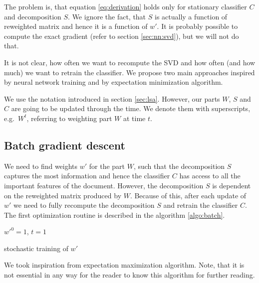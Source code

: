     The problem is, that equation \ref{eq:derivation} holds only for stationary classifier $C$ and decomposition $S$. 
    We ignore the fact, that $S$ is actually a function of reweighted matrix and hence it is a function of $w'$.
    It is probably possible to compute the exact gradient (refer to section \ref{sec:nn:svd}), but we will not do that.
    
    It is not clear, how often we want to recompute the SVD and how often (and how much) we want to retrain the classifier.
    We propose two main approaches inspired by neural network training and by 
    expectation minimization algorithm.
    
    We use the notation introduced in section \ref{sec:lsa}.
    However, our parts $W$, $S$ and $C$ are going to be updated through the time. We denote them with superscripts, e.g.~$W^t$, referring to weighting part $W$ at time $t$.
    
    \subsection{Batch gradient descent}
    
    We need to find weights $w'$ for the part $W$, 
    such that the decomposition $S$ captures the most information and hence the classifier $C$ has access to all the important features of the document.
    However, the decomposition $S$ is dependent on the reweighted matrix produced by $W$. 
    Because of this, after each update of $w'$ we need to fully recompute the decomposition $S$ and retrain the classifier $C$.
    The first optimization routine is described in the algorithm \ref{algo:batch}.
    
    \medskip
    
    \begin{algorithm}[H]
        $w'^0 = 1$, $t=1$\;
        \caption{stochastic training of $w'$} \label{algo:batch}
    \end{algorithm}
    
    We took inspiration from expectation maximization algorithm.  
    Note, that it is not essential in any way for the reader to know this algorithm for further reading.
    
